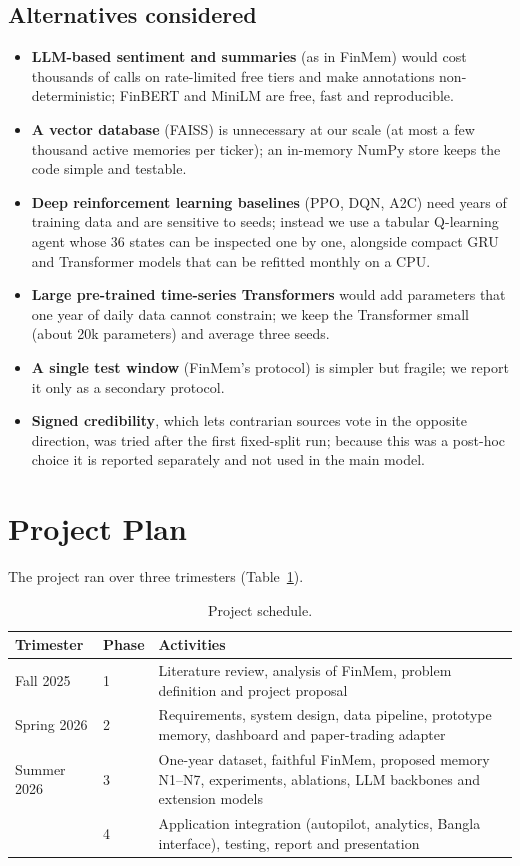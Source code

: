 \subsection{Alternatives considered}
\begin{itemize}
  \item \textbf{LLM-based sentiment and summaries} (as in FinMem) would cost thousands of calls on rate-limited free tiers and make annotations non-deterministic; FinBERT and MiniLM are free, fast and reproducible.
  \item \textbf{A vector database} (FAISS) is unnecessary at our scale (at most a few thousand active memories per ticker); an in-memory NumPy store keeps the code simple and testable.
  \item \textbf{Deep reinforcement learning baselines} (PPO, DQN, A2C) need years of training data and are sensitive to seeds; instead we use a tabular Q-learning agent whose 36 states can be inspected one by one, alongside compact GRU and Transformer models that can be refitted monthly on a CPU.
  \item \textbf{Large pre-trained time-series Transformers} would add parameters that one year of daily data cannot constrain; we keep the Transformer small (about 20k parameters) and average three seeds.
  \item \textbf{A single test window} (FinMem's protocol) is simpler but fragile; we report it only as a secondary protocol.
  \item \textbf{Signed credibility}, which lets contrarian sources vote in the opposite direction, was tried after the first fixed-split run; because this was a post-hoc choice it is reported separately and not used in the main model.
\end{itemize}

\section{Project Plan}
The project ran over three trimesters (Table~\ref{tab:plan}).
\begin{table}[H]
\centering
\caption{Project schedule.}
\label{tab:plan}
\begin{tabular}{llp{}}
\hline
Trimester & Phase & Activities \\
\hline
Fall 2025 & 1 & Literature review, analysis of FinMem, problem definition and project proposal \\
Spring 2026 & 2 & Requirements, system design, data pipeline, prototype memory, dashboard and paper-trading adapter \\
Summer 2026 & 3 & One-year dataset, faithful FinMem, proposed memory N1--N7, experiments, ablations, LLM backbones and extension models \\
 & 4 & Application integration (autopilot, analytics, Bangla interface), testing, report and presentation \\
\hline
\end{tabular}
\end{table}

